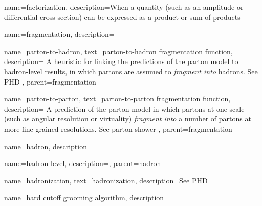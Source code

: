 {
  name=factorization,
  description={When a quantity (such as an amplitude or differential cross section) can be expressed as a product or sum of products}
}







{
  name=fragmentation,
  description={}
}


    {
      name=parton-to-hadron,
      text=parton-to-hadron fragmentation function,
      description={
        A heuristic for linking the predictions of the parton model to hadron-level results, in which partons are assumed to \textit{fragment into} hadrons.
        See PHD
    },
      parent=fragmentation
    }

    {
      name=parton-to-parton,
      text=parton-to-parton fragmentation function,
      description={
          A prediction of the parton model in which partons at one scale (such as angular resolution or virtuality) \textit{fragment into} a number of partons at more fine-grained resolutions.
          See parton shower
      },
      parent=fragmentation
    }






{
  name=hadron,
  description={}
}

    {
      name=hadron-level,
      description={},
      parent=hadron
    }


{
  name=hadronization,
  text=hadronization,
  description={See PHD}
}

{
  name=hard cutoff grooming algorithm,
  description={}
}


